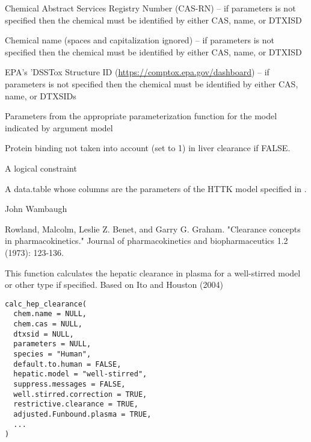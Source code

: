 \documentclass[a4paper]{book}
\begin{document}
\begin{Arguments}
\begin{ldescription}
\item[\code{chem.cas}] Chemical Abstract Services Registry Number (CAS-RN) -- if
parameters is not specified then the chemical must be identified by either
CAS, name, or DTXISD

\item[\code{chem.name}] Chemical name (spaces and capitalization ignored) --  if
parameters is not specified then the chemical must be identified by either
CAS, name, or DTXISD

\item[\code{dtxsid}] EPA's 'DSSTox Structure ID (\url{https://comptox.epa.gov/dashboard})
-- if parameters is not specified then the chemical must be identified by 
either CAS, name, or DTXSIDs

\item[\code{parameters}] Parameters from the appropriate parameterization function
for the model indicated by argument model

\item[\code{restrictive.clearance}] Protein binding not taken into account (set to 1) in 
liver clearance if FALSE.

\item[\code{flow.34}] A logical constraint
\end{ldescription}
\end{Arguments}
%
\begin{Value}
A data.table whose columns are the parameters of the HTTK model
specified in .
\end{Value}
%
\begin{Author}\relax
John Wambaugh
\end{Author}
%
\begin{References}\relax
Rowland, Malcolm, Leslie Z. Benet, and Garry G. Graham. 
"Clearance concepts in pharmacokinetics." Journal of pharmacokinetics and 
biopharmaceutics 1.2 (1973): 123-136.
\end{References}
%
\begin{Description}\relax
This function calculates the hepatic clearance in plasma for a well-stirred model
or other type if specified. Based on  Ito and Houston (2004)
\end{Description}
%
\begin{Usage}
\begin{verbatim}
calc_hep_clearance(
  chem.name = NULL,
  chem.cas = NULL,
  dtxsid = NULL,
  parameters = NULL,
  species = "Human",
  default.to.human = FALSE,
  hepatic.model = "well-stirred",
  suppress.messages = FALSE,
  well.stirred.correction = TRUE,
  restrictive.clearance = TRUE,
  adjusted.Funbound.plasma = TRUE,
  ...
)
\end{verbatim}
\end{Usage}
\end{document}
